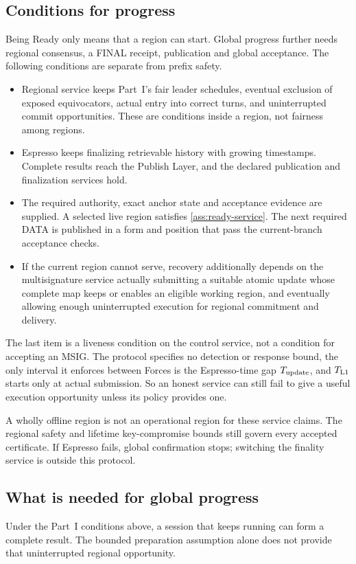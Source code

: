 \documentclass[11pt,a4paper]{article}
\newcounter{protocol}
\begin{document}
\subsection{Conditions for progress}
\label{sec:progress}
Being Ready only means that a region can start. Global progress further
needs regional consensus, a FINAL receipt, publication and global
acceptance. The following conditions are separate from prefix safety.
\begin{itemize}
\item Regional service keeps Part~I's fair leader schedules, eventual
exclusion of exposed equivocators, actual entry into correct turns, and
uninterrupted commit opportunities. These are conditions inside a region,
not fairness among regions.
\item Espresso keeps finalizing retrievable history with growing
timestamps. Complete results reach the Publish Layer, and the declared
publication and finalization services hold.
\item The required authority, exact anchor state and acceptance evidence
are supplied. A selected live region satisfies \cref{ass:ready-service}.
The next required DATA is published in a form and position that pass the
current-branch acceptance checks.
\item If the current region cannot serve, recovery additionally depends
on the multisignature service actually submitting a suitable atomic
update whose complete map keeps or enables an eligible working region,
and eventually allowing
enough uninterrupted execution for regional commitment and delivery.
\end{itemize}
The last item is a liveness condition on the control service, not a
condition for accepting an MSIG. The protocol specifies no detection or
response bound, the only interval it enforces between Forces is the
Espresso-time gap $T_{\rm update}$, and $T_{\rm L1}$ starts only at actual
submission. So an honest service can still fail to
give a useful execution opportunity unless its policy provides one.

A wholly offline region is not an operational region for these service
claims. The regional safety and lifetime key-compromise bounds still
govern every accepted certificate. If Espresso fails, global confirmation stops; switching the
finality service is outside this protocol.

\subsection{What is needed for global progress}
\label{sec:global-progress}
Under the Part~I conditions above, a session that keeps running can form
a complete result. The bounded preparation assumption alone does not
provide that uninterrupted regional opportunity.
\end{document}
